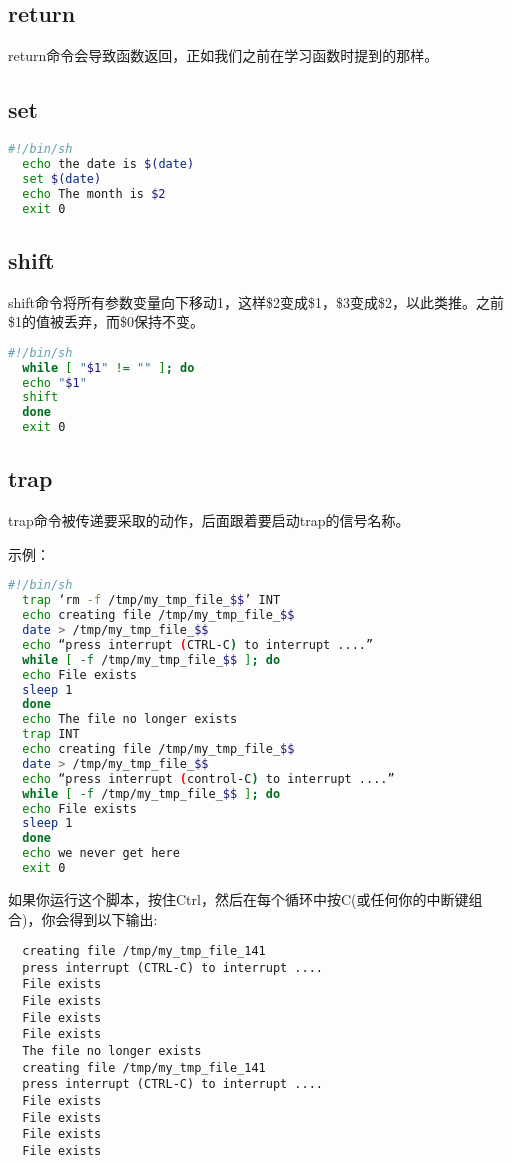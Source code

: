 \documentclass[a4paper]{ctexart}
\begin{document}
\subsection{return}
return命令会导致函数返回，正如我们之前在学习函数时提到的那样。
\subsection{set}
\begin{lstlisting}[language=sh]
  #!/bin/sh
  echo the date is $(date)
  set $(date)
  echo The month is $2
  exit 0
\end{lstlisting}

\subsection{shift}
shift命令将所有参数变量向下移动1，这样\$2变成\$1，\$3变成\$2，以此类推。之前\$1的值被丢弃，而\$0保持不变。
\begin{lstlisting}[language=sh]
  #!/bin/sh
  while [ "$1" != "" ]; do
  echo "$1"
  shift
  done
  exit 0
\end{lstlisting}

\subsection{trap}
trap命令被传递要采取的动作，后面跟着要启动trap的信号名称。

示例：
\begin{lstlisting}[language=sh]
  #!/bin/sh
  trap ‘rm -f /tmp/my_tmp_file_$$’ INT
  echo creating file /tmp/my_tmp_file_$$
  date > /tmp/my_tmp_file_$$
  echo “press interrupt (CTRL-C) to interrupt ....”
  while [ -f /tmp/my_tmp_file_$$ ]; do
  echo File exists
  sleep 1
  done
  echo The file no longer exists
  trap INT
  echo creating file /tmp/my_tmp_file_$$
  date > /tmp/my_tmp_file_$$
  echo “press interrupt (control-C) to interrupt ....”
  while [ -f /tmp/my_tmp_file_$$ ]; do
  echo File exists
  sleep 1
  done
  echo we never get here
  exit 0
\end{lstlisting}
如果你运行这个脚本，按住Ctrl，然后在每个循环中按C(或任何你的中断键组合)，你会得到以下输出: 
\begin{lstlisting}
  creating file /tmp/my_tmp_file_141
  press interrupt (CTRL-C) to interrupt ....
  File exists
  File exists
  File exists
  File exists
  The file no longer exists
  creating file /tmp/my_tmp_file_141
  press interrupt (CTRL-C) to interrupt ....
  File exists
  File exists
  File exists
  File exists
\end{lstlisting}
\end{document}
